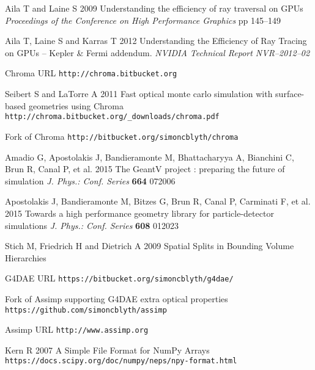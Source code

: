 \documentclass[a4paper]{jpconf}
\begin{document}
\begin{thebibliography}{9}
Aila T and Laine S 
2009
Understanding the efficiency of ray traversal on GPUs
{\it Proceedings of the Conference on High Performance Graphics} pp 145--149

Aila T, Laine S and Karras T
2012
Understanding the Efficiency of Ray Tracing on GPUs – Kepler \& Fermi addendum. 
{\it NVIDIA Technical Report NVR–2012–02}

Chroma URL {\tt http://chroma.bitbucket.org}

Seibert S and LaTorre A 
2011 
Fast optical monte carlo simulation with surface-based geometries using Chroma {\tt http://chroma.bitbucket.org/\_downloads/chroma.pdf}

Fork of Chroma {\tt http://bitbucket.org/simoncblyth/chroma}

Amadio G, Apostolakis J, Bandieramonte M, Bhattacharyya A, Bianchini C, Brun R, Canal P, et al.
2015
The GeantV project : preparing the future of simulation 
{\it J. Phys.: Conf. Series} {\bf 664} 072006

Apostolakis J, Bandieramonte M, Bitzes G, Brun R, Canal P, Carminati F, et al. 
2015
Towards a high performance geometry library for particle-detector simulations
{\it J. Phys.: Conf. Series} {\bf 608} 012023

Stich M, Friedrich H and Dietrich A 
2009
Spatial Splits in Bounding Volume Hierarchies



G4DAE URL {\tt https://bitbucket.org/simoncblyth/g4dae/}

Fork of Assimp supporting G4DAE extra optical properties {\tt https://github.com/simoncblyth/assimp}

Assimp URL {\tt http://www.assimp.org}


Kern R
2007
A Simple File Format for NumPy Arrays
{\tt https://docs.scipy.org/doc/numpy/neps/npy-format.html}


\end{thebibliography}
\end{document}
